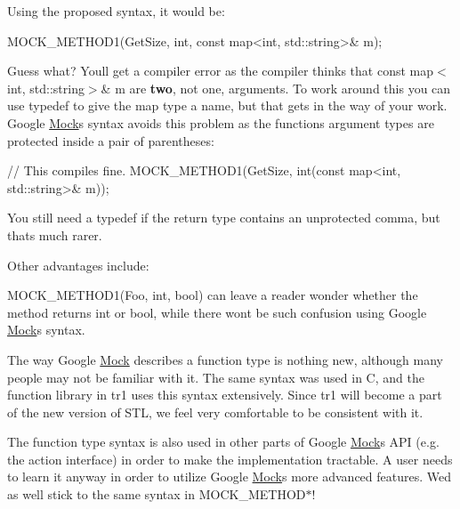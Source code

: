 Using the proposed syntax, it would be\+: 
\begin{DoxyCode}
MOCK\_METHOD1(GetSize, \textcolor{keywordtype}{int}, \textcolor{keyword}{const} map<int, std::string>& m);
\end{DoxyCode}


Guess what? You\textquotesingle{}ll get a compiler error as the compiler thinks that {\ttfamily const map$<$int, std\+::string$>$\& m} are {\bfseries two}, not one, arguments. To work around this you can use {\ttfamily typedef} to give the map type a name, but that gets in the way of your work. Google \hyperlink{classMock}{Mock}\textquotesingle{}s syntax avoids this problem as the function\textquotesingle{}s argument types are protected inside a pair of parentheses\+: 
\begin{DoxyCode}
\textcolor{comment}{// This compiles fine.}
MOCK\_METHOD1(GetSize, \textcolor{keywordtype}{int}(\textcolor{keyword}{const} map<int, std::string>& m));
\end{DoxyCode}


You still need a {\ttfamily typedef} if the return type contains an unprotected comma, but that\textquotesingle{}s much rarer.

Other advantages include\+:
\begin{DoxyEnumerate}
\item {\ttfamily M\+O\+C\+K\+\_\+\+M\+E\+T\+H\+O\+D1(\+Foo, int, bool)} can leave a reader wonder whether the method returns {\ttfamily int} or {\ttfamily bool}, while there won\textquotesingle{}t be such confusion using Google \hyperlink{classMock}{Mock}\textquotesingle{}s syntax.
\end{DoxyEnumerate}
\begin{DoxyEnumerate}
\item The way Google \hyperlink{classMock}{Mock} describes a function type is nothing new, although many people may not be familiar with it. The same syntax was used in C, and the {\ttfamily function} library in {\ttfamily tr1} uses this syntax extensively. Since {\ttfamily tr1} will become a part of the new version of S\+TL, we feel very comfortable to be consistent with it.
\end{DoxyEnumerate}
\begin{DoxyEnumerate}
\item The function type syntax is also used in other parts of Google \hyperlink{classMock}{Mock}\textquotesingle{}s A\+PI (e.\+g. the action interface) in order to make the implementation tractable. A user needs to learn it anyway in order to utilize Google \hyperlink{classMock}{Mock}\textquotesingle{}s more advanced features. We\textquotesingle{}d as well stick to the same syntax in {\ttfamily M\+O\+C\+K\+\_\+\+M\+E\+T\+H\+O\+D$\ast$}!
\end{DoxyEnumerate}

